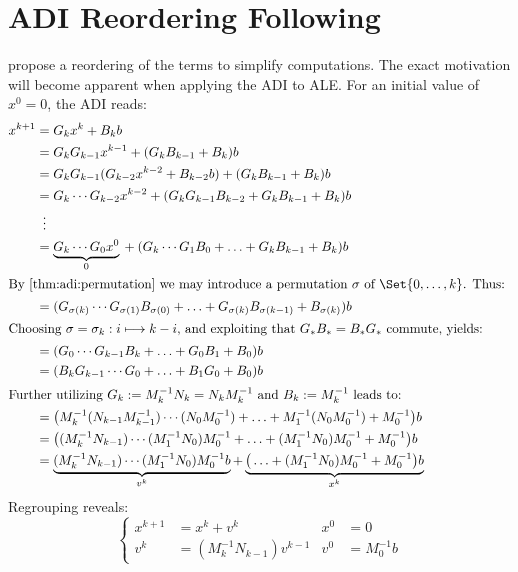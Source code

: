 \chapter{ADI Reordering Following \citeauthor{Li2002}}
\label{sec:li2002}

\citeauthor{Li2002} \cite{Li2002} propose a reordering of the terms to simplify computations.
The exact motivation will become apparent when applying the ADI to \ac{ALE}.
For an initial value of $x^0 = 0$,
the ADI reads:
\begin{align*}
  x^{k+1}
  &= G_k x^k + B_k b \\
  &= G_k G_{k-1} x^{k-1} + (G_k B_{k-1} + B_k) b \\
  &= G_k G_{k-1} (G_{k-2} x^{k-2} + B_{k-2}b) + (G_k B_{k-1} + B_k) b \\
  &= G_k \cdots G_{k-2} x^{k-2} + (G_k G_{k-1} B_{k-2} + G_k B_{k-1} + B_k) b \\
  &\vdotswithin{=} \\
  &= \underbrace{G_k \cdots G_0 x^0}_0 {} + (G_k \cdots G_1 B_0 + \ldots + G_k B_{k-1} + B_k) b \\
\intertext{%
  By \autoref{thm:adi:permutation} we may introduce a permutation $\sigma$ of $\Set{0,\ldots,k}$.
  Thus:
}
  &= (G_{\sigma(k)} \cdots G_{\sigma(1)} B_{\sigma(0)} + \ldots + G_{\sigma(k)} B_{\sigma(k-1)} + B_{\sigma(k)}) b \\
\intertext{%
  Choosing $\sigma = \sigma_k : i \mapsto k-i$,
  and exploiting that $G_* B_* = B_* G_*$ commute,
  yields:
}
  &= (G_0 \cdots G_{k-1} B_k + \ldots + G_0 B_1 + B_0) b \\
  &= (B_k G_{k-1} \cdots G_0 + \ldots + B_1 G_0 + B_0) b \\
\intertext{%
  Further utilizing $G_k := M_k^{-1} N_k = N_k M_k^{-1}$ and $B_k := M_k^{-1}$ leads to:
}
  &= \big( M_k^{-1} (N_{k-1} M_{k-1}^{-1}) \cdots (N_0 M_0^{-1}) + \ldots + M_1^{-1} (N_0 M_0^{-1}) + M_0^{-1} \big) b \\
  &= \big( (M_k^{-1} N_{k-1}) \cdots (M_1^{-1} N_0) M_0^{-1} + \ldots + (M_1^{-1} N_0) M_0^{-1} + M_0^{-1} \big) b \\
  &= \underbrace{
    (M_k^{-1} N_{k-1}) \cdots (M_1^{-1} N_0) M_0^{-1} b
  }_{v^k}
  + \underbrace{
    \big( \ldots + (M_1^{-1} N_0) M_0^{-1} + M_0^{-1} \big) b
  }_{x^k}
\end{align*}
Regrouping reveals:
\begin{equation*}
\left\{
\begin{aligned}
  x^{k+1} &= x^k + v^k &
  x^0 &= 0 \\
  v^k &= (M_k^{-1} N_{k-1}) v^{k-1} &
  v^0 &= M_0^{-1} b
\end{aligned}
\right.
\end{equation*}
